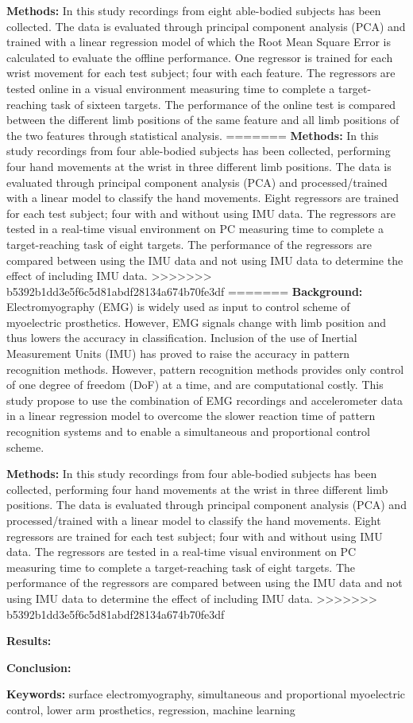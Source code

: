 \textbf{Methods:} In this study recordings from eight able-bodied subjects has been collected. The data is evaluated through principal component analysis (PCA) and trained with a linear regression model of which the Root Mean Square Error is calculated to evaluate the offline performance. One regressor is trained for each wrist movement for each test subject; four with each feature. The regressors are tested online in a visual environment measuring time to complete a target-reaching task of sixteen targets. The performance of the online test is compared between the different limb positions of the same feature and all limb positions of the two features through statistical analysis.
=======
\textbf{Methods:} In this study recordings from four able-bodied subjects has been collected, performing four hand movements at the wrist in three different limb positions. The data is evaluated through principal component analysis (PCA) and processed/trained with a linear model to classify the hand movements. Eight regressors are trained for each test subject; four with and without using IMU data. The regressors are tested in a real-time visual environment on PC measuring time to complete a target-reaching task of eight targets. The performance of the regressors are compared between using the IMU data and not using IMU data to determine the effect of including IMU data. 
>>>>>>> b5392b1dd3e5f6c5d81abdf28134a674b70fe3df
=======
\textbf{Background:} Electromyography (EMG) is widely used as input to control scheme of myoelectric prosthetics. However, EMG signals change with limb position and thus lowers the accuracy in classification.%
Inclusion of the use of Inertial Measurement Units (IMU) has proved to raise the accuracy in pattern recognition methods. However, pattern recognition methods provides only control of one degree of freedom (DoF) at a time, and are computational costly. This study propose to use the combination of EMG recordings and accelerometer data in a linear regression model to overcome the slower reaction time of pattern recognition systems and to enable a simultaneous and proportional control scheme. 


\textbf{Methods:} In this study recordings from four able-bodied subjects has been collected, performing four hand movements at the wrist in three different limb positions. The data is evaluated through principal component analysis (PCA) and processed/trained with a linear model to classify the hand movements. Eight regressors are trained for each test subject; four with and without using IMU data. The regressors are tested in a real-time visual environment on PC measuring time to complete a target-reaching task of eight targets. The performance of the regressors are compared between using the IMU data and not using IMU data to determine the effect of including IMU data. 
>>>>>>> b5392b1dd3e5f6c5d81abdf28134a674b70fe3df




\textbf{Results:} 


\textbf{Conclusion:} 


\textbf{Keywords:} surface electromyography, simultaneous and proportional myoelectric control, lower arm prosthetics, regression, machine learning %
